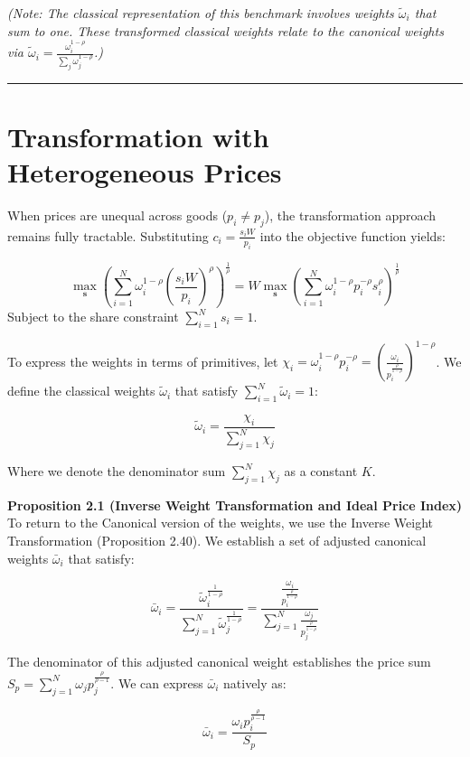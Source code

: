 \documentclass{article}
\begin{document}
\textit{(Note: The classical representation of this benchmark involves weights
$\tilde{\omega}_i$ that sum to one. These transformed classical weights
relate to the canonical weights via
$\tilde{\omega}_i = \frac{\omega_i^{1-\rho}}{\sum_j \omega_j^{1-\rho}}$.)}

\vspace{1em}\hrule\vspace{1em}

\section{Transformation with Heterogeneous Prices}

When prices are unequal across goods ($p_i \neq p_j$), the
transformation approach remains fully tractable. Substituting
$c_i = \frac{s_i W}{p_i}$ into the objective function yields:

$$ \max_{\boldsymbol{s}} \left( \sum_{i=1}^N \omega_i^{1-\rho} \left(\frac{s_i W}{p_i}\right)^\rho \right)^{\frac{1}{\rho}} = W \max_{\boldsymbol{s}} \left( \sum_{i=1}^N \omega_i^{1-\rho} p_i^{-\rho} s_i^\rho \right)^{\frac{1}{\rho}} $$
Subject to the share constraint $\sum_{i=1}^N s_i = 1$.

To express the weights in terms of primitives, let $\chi_i = \omega_i^{1-\rho} p_i^{-\rho} = \left( \frac{\omega_i}{p_i^{\frac{\rho}{1-\rho}}} \right)^{1-\rho}$. We define the classical weights $\tilde{\omega}_i$ that satisfy $\sum_{i=1}^N \tilde{\omega}_i = 1$:

$$ \tilde{\omega}_i = \frac{\chi_i}{\sum_{j=1}^N \chi_j} $$

Where we denote the denominator sum $\sum_{j=1}^N \chi_j$ as a constant $K$.

\textbf{Proposition 2.1 (Inverse Weight Transformation and Ideal Price Index)} To return to the Canonical version of the weights, we use the Inverse Weight Transformation (Proposition 2.40). We establish a set of adjusted canonical weights $\bar{\omega}_i$ that satisfy:

$$ \bar{\omega}_i = \frac{\tilde{\omega}_i^{\frac{1}{1-\rho}}}{\sum_{j=1}^N \tilde{\omega}_j^{\frac{1}{1-\rho}}} = \frac{\frac{\omega_i}{p_i^{\frac{\rho}{1-\rho}}}}{\sum_{j=1}^N \frac{\omega_j}{p_j^{\frac{\rho}{1-\rho}}}} $$

The denominator of this adjusted canonical weight establishes the price sum $S_p = \sum_{j=1}^N \omega_j p_j^{\frac{\rho}{\rho-1}}$. We can express $\bar{\omega}_i$ natively as:

$$ \bar{\omega}_i = \frac{\omega_i p_i^{\frac{\rho}{\rho-1}}}{S_p} $$
\end{document}
